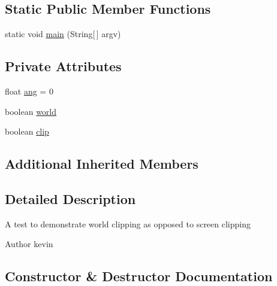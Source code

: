 \subsection*{Static Public Member Functions}
\begin{DoxyCompactItemize}
\item 
static void \mbox{\hyperlink{classorg_1_1newdawn_1_1slick_1_1tests_1_1_clip_test_a2990ac408ea63cbbfb14369e3d1eb04a}{main}} (String\mbox{[}$\,$\mbox{]} argv)
\end{DoxyCompactItemize}
\subsection*{Private Attributes}
\begin{DoxyCompactItemize}
\item 
float \mbox{\hyperlink{classorg_1_1newdawn_1_1slick_1_1tests_1_1_clip_test_ad8fb51467f9faad1ce1cc9dbd039ceb0}{ang}} = 0
\item 
boolean \mbox{\hyperlink{classorg_1_1newdawn_1_1slick_1_1tests_1_1_clip_test_a0f781bd0db027148e91292a5e1f2343e}{world}}
\item 
boolean \mbox{\hyperlink{classorg_1_1newdawn_1_1slick_1_1tests_1_1_clip_test_a598119e064382ed677267a941ed7cfba}{clip}}
\end{DoxyCompactItemize}
\subsection*{Additional Inherited Members}


\subsection{Detailed Description}
A test to demonstrate world clipping as opposed to screen clipping

\begin{DoxyAuthor}{Author}
kevin 
\end{DoxyAuthor}


\subsection{Constructor \& Destructor Documentation}
\mbox{\label{classorg_1_1newdawn_1_1slick_1_1tests_1_1_clip_test_af40320ee7df72425ef9915b48055c543}} 
